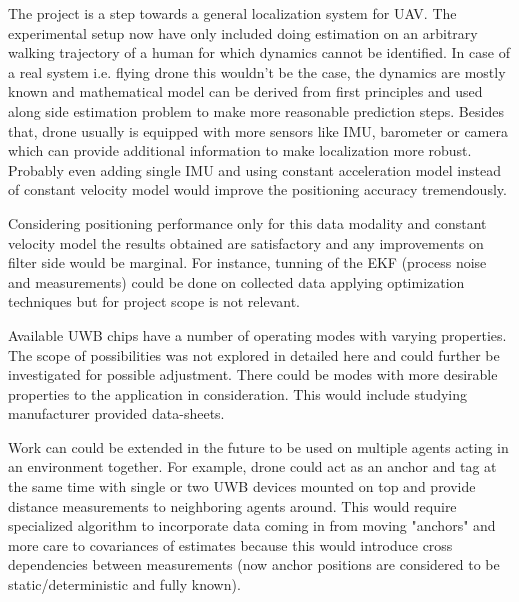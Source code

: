 The project is a step towards a general localization system for UAV. The experimental setup now have only included doing estimation on an arbitrary walking trajectory of a human for which dynamics cannot be identified. In case of a real system i.e. flying drone this wouldn't be the case, the dynamics are mostly known and mathematical model can be derived from first principles and used along side estimation problem to make more reasonable prediction steps. Besides that, drone usually is equipped with more sensors like IMU, barometer or camera which can provide additional information to make localization more robust. Probably even adding single IMU and using constant acceleration model instead of constant velocity model would improve the positioning accuracy tremendously.

Considering positioning performance only for this data modality and constant velocity model the results obtained are satisfactory and any improvements on filter side would be marginal. For instance, tunning of the EKF (process noise and measurements) could be done on collected data applying optimization techniques but for project scope is not relevant.

Available UWB chips have a number of operating modes with varying properties. The scope of possibilities was not explored in detailed here and could further be investigated for possible adjustment. There could be modes with more desirable properties to the application in consideration. This would include studying manufacturer provided data-sheets.

Work can could be extended in the future to be used on multiple agents acting in an environment together. For example, drone could act as an anchor and tag at the same time with single or two UWB devices mounted on top and provide distance measurements to neighboring agents around. This would require specialized algorithm to incorporate data coming in from moving "anchors" and more care to covariances of estimates because this would introduce cross dependencies between measurements (now anchor positions are considered to be static/deterministic and fully known).